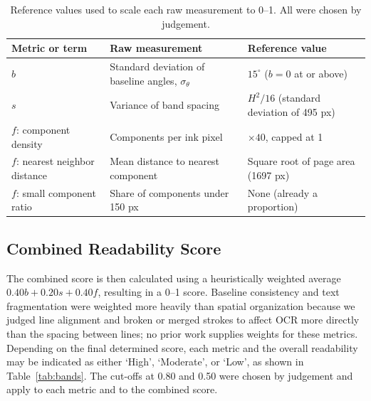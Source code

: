 \documentclass[conference]{IEEEtran}
\begin{document}
\begin{table}[!t]
  \centering
  \caption{Reference values used to scale each raw measurement to 0--1. All
  were chosen by judgement.}
  \label{tab:reference}
  \footnotesize
  \setlength{\tabcolsep}{3pt}
  \renewcommand{\arraystretch}{1.15}
  \begin{tabular}{@{}>{\raggedright\arraybackslash}p{2.1cm}>{\raggedright\arraybackslash}p{2.9cm}>{\raggedright\arraybackslash}p{3.3cm}@{}}
    \toprule
    Metric or term & Raw measurement & Reference value \\
    \midrule
    $b$ & Standard deviation of baseline angles, $\sigma_\theta$ & $15^\circ$ ($b = 0$ at or above) \\
    $s$ & Variance of band spacing & $H^2/16$ (standard deviation of 495 px) \\
    $f$: component density & Components per ink pixel & $\times 40$, capped at 1 \\
    $f$: nearest neighbor distance & Mean distance to nearest component & Square root of page area (1697 px) \\
    $f$: small component ratio & Share of components under 150 px & None (already a proportion) \\
    \bottomrule
  \end{tabular}
\end{table}

\subsection{Combined Readability Score}

The combined score is then calculated using a heuristically weighted average
$0.40b + 0.20s + 0.40f$, resulting in a 0--1 score.
Baseline consistency and text fragmentation were weighted more heavily than
spatial organization because we judged line alignment and broken or merged
strokes to affect OCR more directly than the spacing between lines; no prior
work supplies weights for these metrics.
Depending on the final determined score, each metric and the overall
readability may be indicated as either `High', `Moderate', or `Low', as shown
in Table~\ref{tab:bands}.
The cut-offs at 0.80 and 0.50 were chosen by judgement and apply to each metric
and to the combined score.
\end{document}
